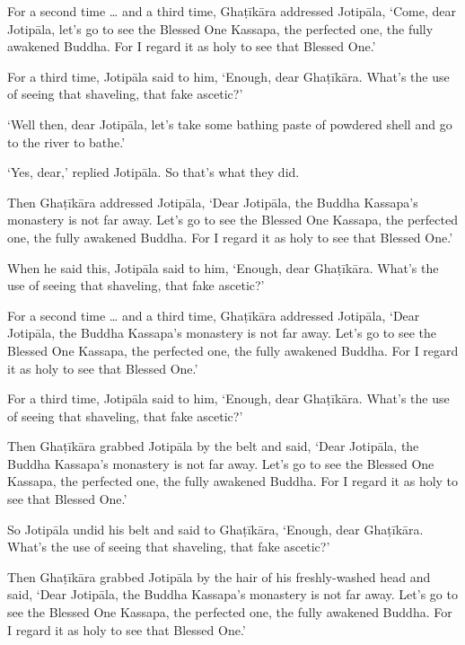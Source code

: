 \documentclass[12pt,openany]{book}%
\begin{document}
For a second time … and a third time, \textsanskrit{Ghaṭīkāra} addressed \textsanskrit{Jotipāla}, ‘Come, dear \textsanskrit{Jotipāla}, let’s go to see the Blessed One Kassapa, the perfected one, the fully awakened Buddha. For I regard it as holy to see that Blessed One.’ 

For a third time, \textsanskrit{Jotipāla} said to him, ‘Enough, dear \textsanskrit{Ghaṭīkāra}. What’s the use of seeing that shaveling, that fake ascetic?’ 

‘Well then, dear \textsanskrit{Jotipāla}, let’s take some bathing paste of powdered shell and go to the river to bathe.’ 

‘Yes, dear,’ replied \textsanskrit{Jotipāla}. So that’s what they did. 

Then \textsanskrit{Ghaṭīkāra} addressed \textsanskrit{Jotipāla}, ‘Dear \textsanskrit{Jotipāla}, the Buddha Kassapa’s monastery is not far away. Let’s go to see the Blessed One Kassapa, the perfected one, the fully awakened Buddha. For I regard it as holy to see that Blessed One.’ 

When he said this, \textsanskrit{Jotipāla} said to him, ‘Enough, dear \textsanskrit{Ghaṭīkāra}. What’s the use of seeing that shaveling, that fake ascetic?’ 

For a second time … and a third time, \textsanskrit{Ghaṭīkāra} addressed \textsanskrit{Jotipāla}, ‘Dear \textsanskrit{Jotipāla}, the Buddha Kassapa’s monastery is not far away. Let’s go to see the Blessed One Kassapa, the perfected one, the fully awakened Buddha. For I regard it as holy to see that Blessed One.’ 

For a third time, \textsanskrit{Jotipāla} said to him, ‘Enough, dear \textsanskrit{Ghaṭīkāra}. What’s the use of seeing that shaveling, that fake ascetic?’ 

Then \textsanskrit{Ghaṭīkāra} grabbed \textsanskrit{Jotipāla} by the belt and said, ‘Dear \textsanskrit{Jotipāla}, the Buddha Kassapa’s monastery is not far away. Let’s go to see the Blessed One Kassapa, the perfected one, the fully awakened Buddha. For I regard it as holy to see that Blessed One.’ 

So \textsanskrit{Jotipāla} undid his belt and said to \textsanskrit{Ghaṭīkāra}, ‘Enough, dear \textsanskrit{Ghaṭīkāra}. What’s the use of seeing that shaveling, that fake ascetic?’ 

Then \textsanskrit{Ghaṭīkāra} grabbed \textsanskrit{Jotipāla} by the hair of his freshly-washed head and said, ‘Dear \textsanskrit{Jotipāla}, the Buddha Kassapa’s monastery is not far away. Let’s go to see the Blessed One Kassapa, the perfected one, the fully awakened Buddha. For I regard it as holy to see that Blessed One.’ 
\end{document}
